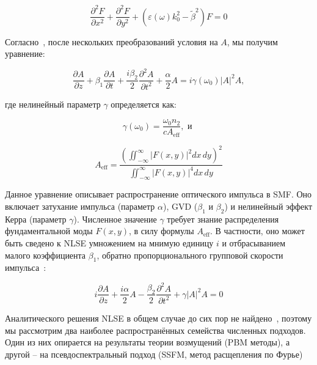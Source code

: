\begin{equation}
	\frac{\partial^2 F}{\partial x^2} + \frac{\partial^2 F}{\partial y^2} + \left( \varepsilon(\omega) k_0^2 - \widetilde{\beta}^2 \right) F = 0
\end{equation}

Согласно~\cite{agrawal2007nonlinear}, после нескольких преобразований условия на $A$, мы получим уравнение:

\begin{equation}
	\frac{\partial A}{\partial z} + \beta_1 \frac{\partial A}{\partial t} + \frac{i\beta_2}{2} \frac{\partial^2 A}{\partial t^2} + \frac{\alpha}{2} A = i\gamma(\omega_0)|A|^2 A,
\end{equation}

где нелинейный параметр $\gamma$ определяется как:

\begin{equation}
	\gamma(\omega_0) = \frac{\omega_0 n_2}{c A_{\text{eff}}}, \text{ и }
\end{equation}

\begin{equation}
	A_{\text{eff}} = \frac{\left(\iint_{-\infty}^{\infty} |F(x,y)|^2 dx\,dy \right)^2}{\iint_{-\infty}^{\infty} |F(x,y)|^4 dx\,dy}
\end{equation}

Данное уравнение описывает распространение оптического импульса в SMF.
Оно включает затухание импульса (параметр $\alpha$), GVD ($\beta_1$ и $\beta_2$) и нелинейный эффект Керра (параметр $\gamma$).
Численное значение $\gamma$ требует знание распределения фундаментальной моды $F(x, y)$, в силу формулы $A_{\text{eff}}$.
В частности, оно может быть сведено к NLSE умножением на мнимую единицу $i$ и отбрасыванием малого коэффициента $\beta_1$, обратно пропорционального групповой скорости импульса~\cite{agrawal2007nonlinear}:

\begin{equation}
	i \frac{\partial A}{\partial z} + \frac{i \alpha}{2} A - \frac{\beta_2}{2}\frac{\partial^2 A}{\partial t^2} + \gamma \left| A \right|^2 A = 0
\end{equation}

Аналитического решения NLSE в общем случае до сих пор не найдено~\cite{sasai2021physics, ARORA2022169661}, поэтому мы рассмотрим два наиболее распространённых семейства численных подходов.
Один из них опирается на результаты теории возмущений (PBM методы), а другой -- на псевдоспектральный подход (SSFM, метод расщепления по Фурье)

